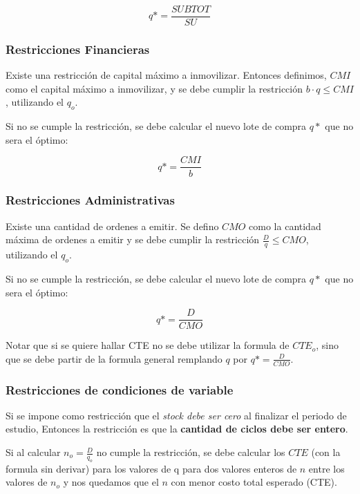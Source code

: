 \documentclass{article}
\begin{document}
\begin{equation}
    q* = \frac{SUBTOT}{SU}
\end{equation}


\subsubsection{Restricciones Financieras}
Existe una restricción de capital máximo a inmovilizar. Entonces definimos, \(CMI\) como el capital máximo a inmovilizar,
y se debe cumplir la restricción \(b \cdot q \leq CMI\), utilizando el \(q_o\).

Si no se cumple la restricción, se debe calcular el nuevo lote de compra \(q*\) que no sera el óptimo:

\begin{equation}
    q* = \frac{CMI}{b}
\end{equation}

\subsubsection{Restricciones Administrativas}
Existe una cantidad de ordenes a emitir. Se defino \(CMO\) como la cantidad máxima de ordenes a emitir y 
se debe cumplir la restricción \(\frac{D}{q} \leq CMO\), utilizando el \(q_o\).

Si no se cumple la restricción, se debe calcular el nuevo lote de compra \(q*\) que no sera el óptimo:

\begin{equation}
    q* = \frac{D}{CMO}
\end{equation}

Notar que si se quiere hallar CTE no se debe utilizar la formula de \(CTE_o\), sino que se debe partir de la formula general
remplando \(q\) por \(q*=\frac{D}{CMO}\).

\subsubsection{Restricciones de condiciones de variable}

Si se impone como restricción que el \textit{stock debe ser cero} al finalizar el periodo de estudio,
Entonces la restricción es que la \textbf{cantidad de ciclos debe ser entero}.

Si al calcular \(n_o = \frac{D}{q_o}\) no cumple la restricción, se debe calcular los \(CTE\) (con la formula sin derivar) para los valores
de q para dos valores enteros de \(n\) entre los valores de \(n_o\) y nos quedamos que el \(n\) con menor costo total esperado (CTE).
\end{document}
